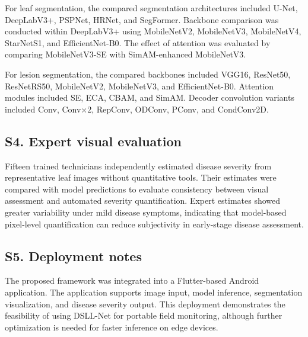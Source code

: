 For leaf segmentation, the compared segmentation architectures included
U-Net, DeepLabV3+, PSPNet, HRNet, and SegFormer. Backbone comparison was
conducted within DeepLabV3+ using MobileNetV2, MobileNetV3, MobileNetV4,
StarNetS1, and EfficientNet-B0. The effect of attention was evaluated by
comparing MobileNetV3-SE with SimAM-enhanced MobileNetV3.

For lesion segmentation, the compared backbones included VGG16,
ResNet50, ResNetRS50, MobileNetV2, MobileNetV3, and EfficientNet-B0.
Attention modules included SE, ECA, CBAM, and SimAM. Decoder convolution
variants included Conv, Conv×2, RepConv, ODConv, PConv, and CondConv2D.

\subsection*{S4. Expert visual evaluation}

Fifteen trained technicians independently estimated disease severity
from representative leaf images without quantitative tools. Their
estimates were compared with model predictions to evaluate consistency
between visual assessment and automated severity quantification. Expert
estimates showed greater variability under mild disease symptoms,
indicating that model-based pixel-level quantification can reduce
subjectivity in early-stage disease assessment.

\subsection*{S5. Deployment notes}

The proposed framework was integrated into a Flutter-based Android
application. The application supports image input, model inference,
segmentation visualization, and disease severity output. This deployment
demonstrates the feasibility of using DSLL-Net for portable field
monitoring, although further optimization is needed for faster inference
on edge devices.
